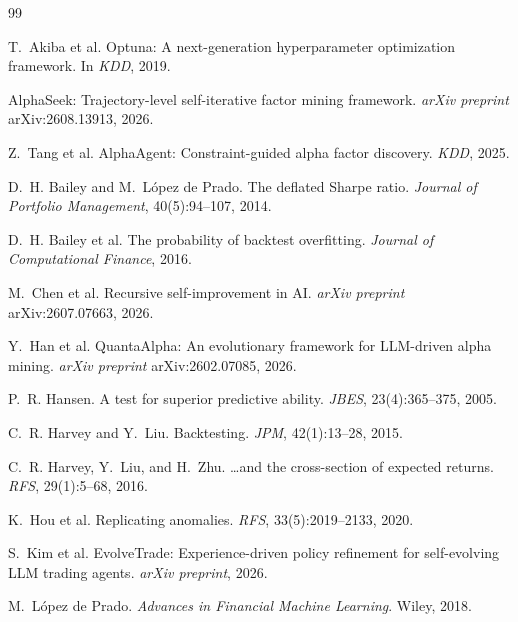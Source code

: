 \documentclass[11pt]{article}
\begin{document}

\begin{thebibliography}{99}

T.~Akiba et al.
\newblock Optuna: A next-generation hyperparameter optimization framework.
\newblock In \emph{KDD}, 2019.

\newblock AlphaSeek: Trajectory-level self-iterative factor mining framework.
\newblock \emph{arXiv preprint} arXiv:2608.13913, 2026.

Z.~Tang et al.
\newblock AlphaAgent: Constraint-guided alpha factor discovery.
\newblock \emph{KDD}, 2025.

D.~H. Bailey and M.~L\'opez de Prado.
\newblock The deflated Sharpe ratio.
\newblock \emph{Journal of Portfolio Management}, 40(5):94--107, 2014.

D.~H. Bailey et al.
\newblock The probability of backtest overfitting.
\newblock \emph{Journal of Computational Finance}, 2016.

M.~Chen et al.
\newblock Recursive self-improvement in AI.
\newblock \emph{arXiv preprint} arXiv:2607.07663, 2026.

Y.~Han et al.
\newblock QuantaAlpha: An evolutionary framework for LLM-driven alpha mining.
\newblock \emph{arXiv preprint} arXiv:2602.07085, 2026.

P.~R. Hansen.
\newblock A test for superior predictive ability.
\newblock \emph{JBES}, 23(4):365--375, 2005.

C.~R. Harvey and Y.~Liu.
\newblock Backtesting.
\newblock \emph{JPM}, 42(1):13--28, 2015.

C.~R. Harvey, Y.~Liu, and H.~Zhu.
\newblock \ldots and the cross-section of expected returns.
\newblock \emph{RFS}, 29(1):5--68, 2016.

K.~Hou et al.
\newblock Replicating anomalies.
\newblock \emph{RFS}, 33(5):2019--2133, 2020.

S.~Kim et al.
\newblock EvolveTrade: Experience-driven policy refinement for self-evolving
  LLM trading agents.
\newblock \emph{arXiv preprint}, 2026.

M.~L\'opez de Prado.
\newblock \emph{Advances in Financial Machine Learning}.
\newblock Wiley, 2018.


\end{thebibliography}
\end{document}
